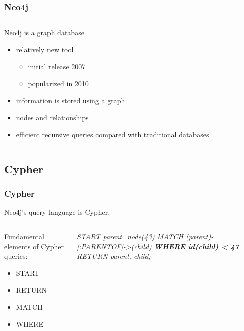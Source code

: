 \documentclass{beamer}
\begin{document}
\begin{frame}
	\frametitle{Neo4j}
	
	
	
\begin{columns} 
\begin{column}{0.60 \textwidth}
Neo4j is a graph database.
		\begin{itemize}
		\item relatively new tool
			\begin{itemize}
			\item initial release 2007
			\item popularized in 2010
			\end{itemize}
		\item information is stored using a graph
		\item nodes and relationships
		\item efficient recursive queries compared with traditional databases
		\end{itemize}
		\end{column}
		\begin{column}{0.40\textwidth}
       \\
  \end{column}
  \end{columns}

\end{frame}

\subsection{Cypher}

\begin{frame}
	\frametitle{Cypher}
	Neo4j's query language is Cypher.
	\begin{columns}
	\begin{column}{0.40\textwidth}

	Fundamental elements of Cypher queries:
		\begin{itemize}
		\item START
		\item RETURN
		\item MATCH
		\item WHERE
		\end{itemize}
	\end{column}
	\begin{column}{0.60\textwidth}

	\emph{
START parent=node(43)
\linebreak
MATCH (parent)-[:PARENTOF]->(child)
\linebreak
\textbf{WHERE id(child) < 47}
\linebreak
RETURN parent, child;
}

	\end{column}	
	\end{columns}
\end{frame}
\end{document}

